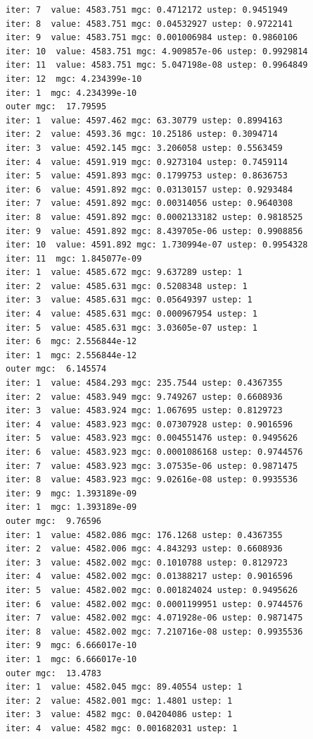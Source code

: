 \documentclass[
  letterpaper,
  DIV=11,
  numbers=noendperiod]{scrartcl}
\begin{document}
\begin{verbatim}
iter: 7  value: 4583.751 mgc: 0.4712172 ustep: 0.9451949 
iter: 8  value: 4583.751 mgc: 0.04532927 ustep: 0.9722141 
iter: 9  value: 4583.751 mgc: 0.001006984 ustep: 0.9860106 
iter: 10  value: 4583.751 mgc: 4.909857e-06 ustep: 0.9929814 
iter: 11  value: 4583.751 mgc: 5.047198e-08 ustep: 0.9964849 
iter: 12  mgc: 4.234399e-10 
iter: 1  mgc: 4.234399e-10 
outer mgc:  17.79595 
iter: 1  value: 4597.462 mgc: 63.30779 ustep: 0.8994163 
iter: 2  value: 4593.36 mgc: 10.25186 ustep: 0.3094714 
iter: 3  value: 4592.145 mgc: 3.206058 ustep: 0.5563459 
iter: 4  value: 4591.919 mgc: 0.9273104 ustep: 0.7459114 
iter: 5  value: 4591.893 mgc: 0.1799753 ustep: 0.8636753 
iter: 6  value: 4591.892 mgc: 0.03130157 ustep: 0.9293484 
iter: 7  value: 4591.892 mgc: 0.00314056 ustep: 0.9640308 
iter: 8  value: 4591.892 mgc: 0.0002133182 ustep: 0.9818525 
iter: 9  value: 4591.892 mgc: 8.439705e-06 ustep: 0.9908856 
iter: 10  value: 4591.892 mgc: 1.730994e-07 ustep: 0.9954328 
iter: 11  mgc: 1.845077e-09 
iter: 1  value: 4585.672 mgc: 9.637289 ustep: 1 
iter: 2  value: 4585.631 mgc: 0.5208348 ustep: 1 
iter: 3  value: 4585.631 mgc: 0.05649397 ustep: 1 
iter: 4  value: 4585.631 mgc: 0.000967954 ustep: 1 
iter: 5  value: 4585.631 mgc: 3.03605e-07 ustep: 1 
iter: 6  mgc: 2.556844e-12 
iter: 1  mgc: 2.556844e-12 
outer mgc:  6.145574 
iter: 1  value: 4584.293 mgc: 235.7544 ustep: 0.4367355 
iter: 2  value: 4583.949 mgc: 9.749267 ustep: 0.6608936 
iter: 3  value: 4583.924 mgc: 1.067695 ustep: 0.8129723 
iter: 4  value: 4583.923 mgc: 0.07307928 ustep: 0.9016596 
iter: 5  value: 4583.923 mgc: 0.004551476 ustep: 0.9495626 
iter: 6  value: 4583.923 mgc: 0.0001086168 ustep: 0.9744576 
iter: 7  value: 4583.923 mgc: 3.07535e-06 ustep: 0.9871475 
iter: 8  value: 4583.923 mgc: 9.02616e-08 ustep: 0.9935536 
iter: 9  mgc: 1.393189e-09 
iter: 1  mgc: 1.393189e-09 
outer mgc:  9.76596 
iter: 1  value: 4582.086 mgc: 176.1268 ustep: 0.4367355 
iter: 2  value: 4582.006 mgc: 4.843293 ustep: 0.6608936 
iter: 3  value: 4582.002 mgc: 0.1010788 ustep: 0.8129723 
iter: 4  value: 4582.002 mgc: 0.01388217 ustep: 0.9016596 
iter: 5  value: 4582.002 mgc: 0.001824024 ustep: 0.9495626 
iter: 6  value: 4582.002 mgc: 0.0001199951 ustep: 0.9744576 
iter: 7  value: 4582.002 mgc: 4.071928e-06 ustep: 0.9871475 
iter: 8  value: 4582.002 mgc: 7.210716e-08 ustep: 0.9935536 
iter: 9  mgc: 6.666017e-10 
iter: 1  mgc: 6.666017e-10 
outer mgc:  13.4783 
iter: 1  value: 4582.045 mgc: 89.40554 ustep: 1 
iter: 2  value: 4582.001 mgc: 1.4801 ustep: 1 
iter: 3  value: 4582 mgc: 0.04204086 ustep: 1 
iter: 4  value: 4582 mgc: 0.001682031 ustep: 1 

\end{verbatim}
\end{document}
